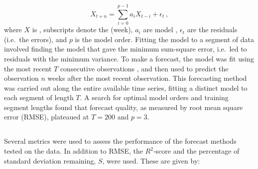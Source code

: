 \documentclass[review]{elsarticle}
\begin{document}
\begin{equation}
X_{t+n}=\sum_{i=0}^{p-1}a_iX_{t-i}+\epsilon_t\,, \label{eq:AR1}
\end{equation}
where $X$ is , subscripts denote the  (week), $a_i$ are model , $\epsilon_t$ are the residuals (i.e.~the errors), and $p$ is  the model order.  Fitting the model to a segment of data involved finding the model  that gave the minimum sum-square error, i.e.~led to residuals with the minimum variance. To make a forecast, the model was fit using the most recent $T$ consecutive observations , and then used to predict the observation $n$ weeks after the most recent observation. This forecasting method was carried out along the entire available time series, fitting a distinct model to each segment of length $T$. A search for optimal model orders and training segment lengths found that forecast quality, as measured by root mean square error (RMSE), plateaued at $T=200$ and $p=3$.%





\subsection{}
Several metrics were used to assess the performance of the forecast methods tested on the data. In addition to RMSE, the $R^2$-score and the percentage of standard deviation remaining, $S$, were used. These are given by:
\end{document}
